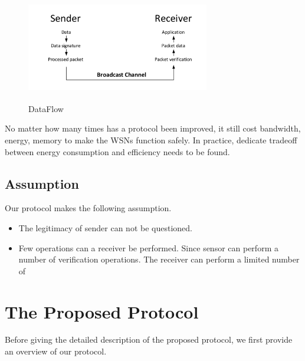 \documentclass{sig-alternate-05-2015}
\begin{document}
\begin{figure}
\centering
\includegraphics[width=8cm,height=4cm]{DataFlow.pdf}\\
\caption{DataFlow}\label{} 
\end{figure}
No matter how many times has a protocol been improved,
it still cost bandwidth, energy, memory to make the WSNs function safely. In practice, dedicate tradeoff between energy consumption and efficiency needs to be found.

\subsection{Assumption}
Our protocol makes the following assumption.
\begin{itemize}
    \item The legitimacy of sender can not be questioned. 
    \item  
    Few operations can a receiver be performed. Since sensor can perform a number of verification operations.
    The receiver can perform a limited number of 
    
\end{itemize}
\section{The Proposed Protocol}
Before giving the detailed description of the proposed protocol, we first provide an overview of our protocol.
\end{document}
